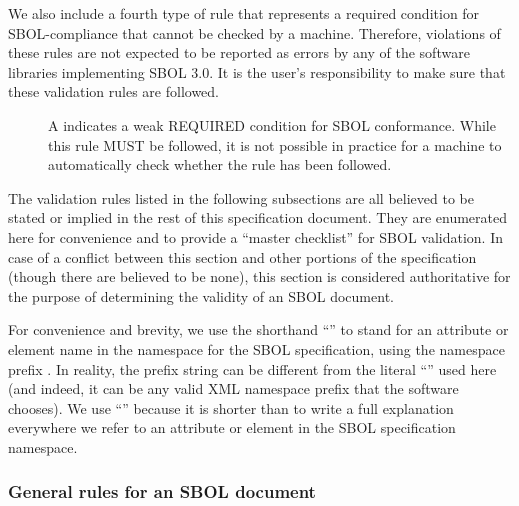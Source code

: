 We also include a fourth type of rule that represents a required condition for SBOL-compliance that cannot be checked by a machine. Therefore, violations of these rules are not expected to be reported as errors by any of the software libraries implementing SBOL 3.0. It is the user's responsibility to make sure that these validation rules are followed.

\begin{description}
\item[\hspace*{6.5pt}\cSymbol\csp] A \cSymbolName indicates a weak REQUIRED condition for SBOL conformance. While this rule MUST be followed, it is not possible in practice for a machine to automatically check whether the rule has been followed.
\end{description}


The validation rules listed in the following subsections are all believed to be
stated or implied in the rest of this specification document.  They
are enumerated here for convenience and to provide a ``master
checklist'' for SBOL validation.  In case of a conflict between this
section and other portions of the specification (though there are believed to
be none), this section is considered authoritative for the purpose of
determining the validity of an SBOL document.

For \notice convenience and brevity, we use the shorthand
``'' to stand for an attribute or element name 
in the namespace for the SBOL specification, using
the namespace prefix .  In reality, the prefix string can be different from the literal ``'' used here (and indeed, it can be any valid XML namespace prefix that the software
chooses).  We use ``'' because it is shorter than to
write a full explanation everywhere we refer to an attribute or element
in the SBOL specification namespace.

\subsubsection*{General rules for an SBOL document}
\setcounter{sbolCtr}{10101} 


